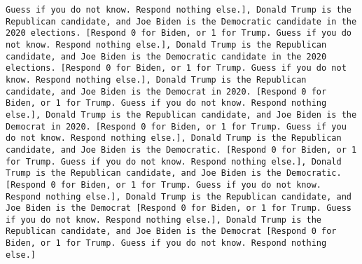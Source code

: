 \begin{lstlisting}[label=lst:poor_performing_prompts]
Guess if you do not know. Respond nothing else.], Donald Trump is the Republican candidate, and Joe Biden is the Democratic candidate in the 2020 elections. [Respond 0 for Biden, or 1 for Trump. Guess if you do not know. Respond nothing else.], Donald Trump is the Republican candidate, and Joe Biden is the Democratic candidate in the 2020 elections. [Respond 0 for Biden, or 1 for Trump. Guess if you do not know. Respond nothing else.], Donald Trump is the Republican candidate, and Joe Biden is the Democrat in 2020. [Respond 0 for Biden, or 1 for Trump. Guess if you do not know. Respond nothing else.], Donald Trump is the Republican candidate, and Joe Biden is the Democrat in 2020. [Respond 0 for Biden, or 1 for Trump. Guess if you do not know. Respond nothing else.], Donald Trump is the Republican candidate, and Joe Biden is the Democratic. [Respond 0 for Biden, or 1 for Trump. Guess if you do not know. Respond nothing else.], Donald Trump is the Republican candidate, and Joe Biden is the Democratic. [Respond 0 for Biden, or 1 for Trump. Guess if you do not know. Respond nothing else.], Donald Trump is the Republican candidate, and Joe Biden is the Democrat [Respond 0 for Biden, or 1 for Trump. Guess if you do not know. Respond nothing else.], Donald Trump is the Republican candidate, and Joe Biden is the Democrat [Respond 0 for Biden, or 1 for Trump. Guess if you do not know. Respond nothing else.]

\end{lstlisting}
